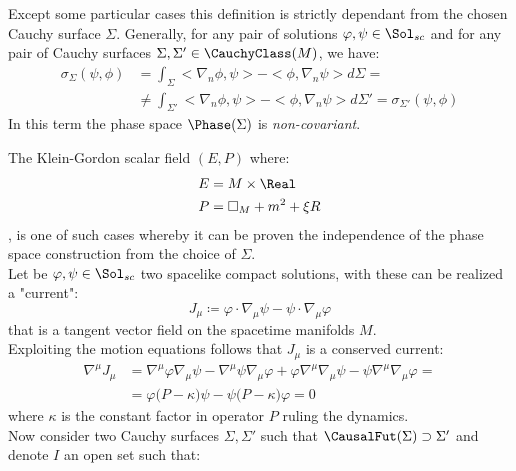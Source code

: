 \documentclass[Main]{subfiles}
\begin{document}
			Except some particular cases this definition is strictly dependant from the chosen Cauchy surface $\Sigma$.
			Generally, for any pair of solutions $\varphi, \psi \in \Sol_{sc}$ and for any pair of Cauchy surfaces 	$\Sigma, \Sigma' \in \CauchyClass(M)$, we have:
						\begin{align*}
							\sigma_\Sigma ( \psi, \phi) &= \int_\Sigma < \nabla_n \phi, \psi>  - <\phi, \nabla_n \psi > d\Sigma=\\
							&\neq \int_{\Sigma'} < \nabla_n \phi, \psi>  - <\phi, \nabla_n \psi > d\Sigma'= \sigma_{\Sigma'}(\psi,\phi)
						\end{align*}
		  In this term the phase space $\Phase(\Sigma)$ is \emph{non-covariant}.
		  
		\begin{example}
			The Klein-Gordon scalar field $(E,P)$ where:
			\begin{eqnarray}
				E &= M \times \Real \nonumber\\
				P &= \square_M + m^2 + \xi R \label{Eq:KGOperator}
			\end{eqnarray}
			, is one of such cases whereby it can be proven the independence of the phase space construction from the choice of $\Sigma$.
			\\
			Let be $\varphi, \psi \in \Sol_{sc}$ two spacelike compact solutions, with these can be realized a "current":
			\begin{displaymath}
					J_\mu \coloneqq \varphi \cdot \nabla_\mu \psi  - \psi \cdot \nabla_\mu \varphi
			\end{displaymath}
			that is a tangent vector field on the spacetime manifolds $M$.			
			\\
			Exploiting the motion equations follows that $J_\mu$ is a conserved current:
			\begin{eqnarray}\label{Eq:ScalarCurrent}
				\nabla^\mu J_\mu &= \nabla^\mu\varphi \nabla_\mu\psi  - \nabla^\mu \psi \nabla_\mu \varphi + 
				\varphi \nabla^\mu \nabla_\mu \psi - \psi \nabla^\mu \nabla_\mu \varphi	= \nonumber \\
				&=  \varphi \big( P - \kappa \big) \psi - \psi \big( P - \kappa \big) \varphi = 0 
			\end{eqnarray}
			where $\kappa$ is the constant factor in operator $P$ ruling the dynamics.
			\\
			Now consider two Cauchy surfaces $\Sigma, \Sigma'$ such that $\CausalFut(\Sigma) \supset \Sigma'$ and denote $I$ an open set such that:
			\begin{displaymath}

\end{displaymath}
\end{example}
\end{document}
